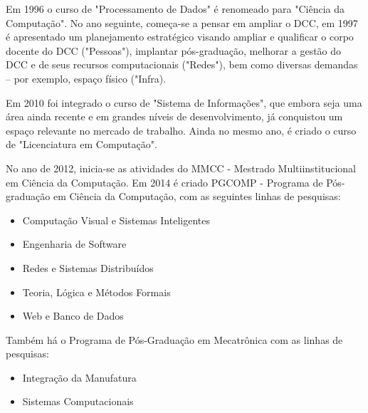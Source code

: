 Em 1996 o curso de "Processamento de Dados" é  renomeado para "Ciência da Computação". No ano seguinte, começa-se a pensar em ampliar o DCC, em 1997 é apresentado um planejamento estratégico visando ampliar e qualificar o corpo docente do DCC ("Pessoas"), implantar pós-graduação, melhorar a gestão do DCC e de seus recursos computacionais ("Redes"), bem como diversas demandas -- por exemplo, espaço físico ("Infra).

Em 2010 foi integrado o curso de "Sistema de Informações", que embora seja uma área ainda recente e em grandes níveis de desenvolvimento, já conquistou um espaço relevante no mercado de trabalho. Ainda no mesmo ano, é criado o curso de "Licenciatura em Computação".
  
No ano de 2012, inicia-se as atividades do  MMCC - Mestrado Multiinstitucional em Ciência da Computação. Em 2014 é criado PGCOMP - Programa de Pós-graduação em Ciência da Computação, com as seguintes linhas de pesquisas: 
       \begin{itemize}

  \item Computação Visual e Sistemas Inteligentes
 \item Engenharia de Software
 \item Redes e Sistemas Distribuídos
 \item Teoria, Lógica e Métodos Formais
 \item Web e Banco de Dados\\
                 \end{itemize}
	Também há o Programa de Pós-Graduação em Mecatrônica com as linhas de pesquisas:

\begin{itemize}
  \item Integração da Manufatura
 \item Sistemas Computacionais\\
\end{itemize}
  